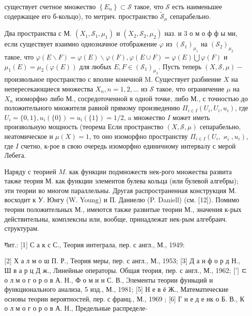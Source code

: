 \documentclass[10pt]{article}
\begin{document}
существует счетное множество $\left\{E_{n}\right\} \subset \mathscr{S}$ такое, что $\mathscr{S}$ есть наименьшее содержащее его б-кольцо), то метрич. пространство $\tilde{\mathscr{S}}_{\mu}$ сепарабельно.



Два пространства с М. $\left(X_{1}, \mathscr{S}_{1}, \mu_{1}\right)$ и $\left(X_{2}, \mathscr{S}_{2}, \mu_{2}\right)$ наз. и 3 о м о ф ф ы ми, если существует взаимно однозначное отображение $\varphi$ из $\left(\mathscr{S}_{1}\right)_{\mu_{1}}$ на $\left(\mathscr{S}_{2}\right)_{\mu_{2}}$ такое, что $\varphi(E \backslash F)=\varphi(E) \backslash \varphi(F), \varphi(E \cup F)=\varphi(E) \bigcup \varphi(F)$ и $\mu_{1}(E)=\mu_{2}(\varphi(E))$ для любых $E, F \in\left(\mathscr{S}_{1}\right)_{\mu_{3}}$. Пусть теперь $(X, \mathscr{S}, \mu)-$ произвольное пространство с вполне конечной M. Существует разбиение $X$ на непересекающиеся множества $X_{n}, n=1,2, \ldots$ из $\mathscr{S}$ такое, что ограничение $\mu$ на $X_{n}$ изоморфно либо М., сосредоточенной в одной точке, либо М., с точностью до положительного множителя равной прямому произведению $\Pi_{i \in I}\left(U_{i}, U_{i}, u_{i}\right)$, где $U_{i}=\{0,1\}, u_{i}(\{0\})=u_{i}(\{1\})=1 / 2$, a множество $I$ может иметь произвольную мощность (теорема Если пространство $(X, \mathscr{S}, \mu)$ сепарабельно, неатомическое и $\mu(X)=1$, то оно изоморфно пространству $\Pi_{i \in I}\left(U_{i}, \varkappa_{i}, u_{i}\right)$, где $I$ счетно, к-рое в свою очередь изоморфно единичному интервалу с мерой Лебега.



Наряду с теорией $M$. как функции подмножеств нек-рого множества развита также теория М. как функции элементов булева кольца (или булевой алгебры); эти теории во многом параллельны. Другая распространенная конструкция М. восходит к У. Юнгу (W. Young) и П. Даниелю (P. Daniell) (см. [12]). Помимо теории положительных М., имеются также развитые теории М., значения к-рых действительны, комплексны или, вообще, принадлежат нек-рым алгебраич. структурам.



गит.: [1] С а к с С., Теория интеграла, пер. с англ., М., 1949:



[2] Х а л м о ш П. Р., Теория меры, пер. с англ., М., 1953; [3] Д а н ф о р д Н., Ш в а р ц Д ж., Линейные операторы. Общая теория, пер. с англ., М., 1962; ['] ㄷ о л м о г о р о в А. Н., Ф о м и н С. В., Элементы теории фунњций и функционального анализа, 5 изд., М., 1981; [5] Н е в ё Ж., Математические основы теории вероятностей, пер. с франц., М., 1969 ; [6] Г н е д е нк о Б. В., К о л м о г о р о в А. Н., Предельные распределе-
\end{document}
